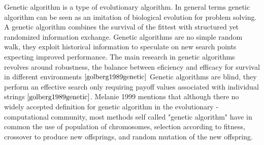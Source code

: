 \documentclass{book}
\begin{document}
Genetic algorithm is a type of evolutionary algorithm. In general terms genetic algorithm can be seen as an imitation of biological evolution for problem solving. A genetic algorithm combines the survival of the fittest with  structured yet randomized information exchange. Genetic algorithms are no simple random walk, they exploit historical information to speculate on new search points expecting improved performance. The main research in genetic algorithms revolves around robustness, the balance between eficiency and efficacy for survival in different environments $\cite{golberg1989genetic}$ Genetic algorithms are blind, they perform an effective search only requiring payoff values associated with individual strings $\cite{golberg1989genetic}$.  Melanie 1999 mentions that although there no widely accepted definition for genetic algorithm in the evolutionary - computational community, most methods self called "genetic algorithm" have in common the use of population of chromosomes, selection according to fitness, crossover to produce new offsprings, and random mutation of the new offspring.  
\end{document}
